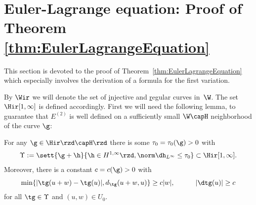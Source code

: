 \section{Euler-Lagrange equation: Proof of Theorem \ref{thm:EulerLagrangeEquation}}

This section is devoted to the proof of Theorem~\ref{thm:EulerLagrangeEquation}
which especially involves the derivation of a formula for the first variation.

By $\Wir$ we will denote the set of \underline injective and \underline regular curves in~$\W$.
The set $\Hir[1,\infty]$ is defined accordingly.
First we will need
the following lemma, to guarantee that $E^{(2)}$ is well defined on a
sufficiently small $\W\capH$ neighborhood of the curve $\g$:



\begin{lemma}\label{lem:Upsilon}
 For any $\g\in\Hir \rzd \capH \rzd$ there is some $\tau_0=\tau_0(\g)>0$ with
 \begin{equation}\label{eq:Upsilon}
  \Upsilon := \sett{\g+\h}{\h\in H^{1,\infty}\rzd, \norm\dh_{L^\infty}\le\tau_0}\subset\Hir[1,\infty].
 \end{equation}
 Moreover, there is a constant $c=c(\g)>0$ with
 \begin{equation} \label{eq:fundamentalEstimates}
 \min\{|\tg(u+w) - \tg(u)|, d_{\tg}(u+w,u)\}  \geq c |w|, \quad \quad
 \quad|\dtg(u)| \geq c
 \end{equation}
 for all $\tg \in \Upsilon$ and $(u,w) \in U_0$.
\end{lemma}

